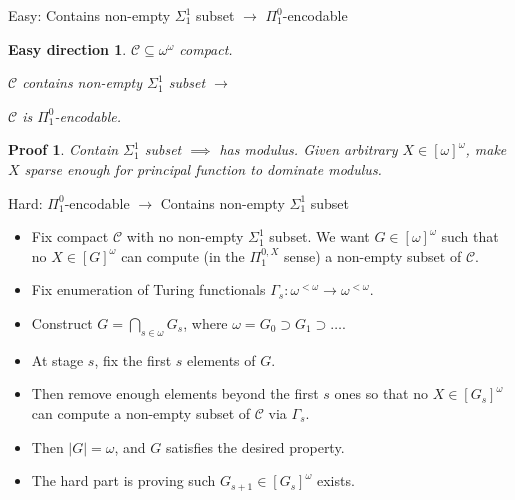 \begin{frame}{Easy: Contains non-empty $\Sigma_1^1$ subset $\rightarrow$
$\Pi_1^0$-encodable}
  \newtheorem{main-easy}{Easy direction}
  \begin{main-easy}
    $\mathcal{C}\subseteq \omega^{\omega}$ compact.

    $\mathcal{C}$ contains non-empty $\Sigma_1^1$ subset
    $\rightarrow$

    $\mathcal{C}$ is $\Pi_1^0$-encodable.
  \end{main-easy}

  \newtheorem{pf-easy}{Proof}
  \begin{pf-easy}
    Contain $\Sigma_1^1$ subset $\implies$ has modulus. Given arbitrary
    $X\in[\omega]^\omega$, make $X$ sparse enough for principal function to
    dominate modulus.
  \end{pf-easy}
\end{frame}

\begin{frame}{Hard: $\Pi_1^0$-encodable $\rightarrow$ Contains
non-empty $\Sigma_1^1$ subset}
  \begin{itemize}
    \item Fix compact $\mathcal{C}$ with no non-empty $\Sigma_1^1$ subset.
      We want $G\in[\omega]^\omega$ such that no $X\in[G]^\omega$
      can compute (in the $\Pi_1^{0,X}$ sense) a non-empty subset of
      $\mathcal{C}$.

    \item Fix enumeration of Turing functionals $\Gamma_s:\omega^{<\omega}
      \rightarrow \omega^{<\omega}$.

    \item Construct $G=\bigcap_{s\in\omega}G_s$, where
      $\omega=G_0\supset G_1\supset\ldots$.
      
    \item At stage $s$, fix the first $s$ elements of $G$.
    
    \item Then remove enough elements beyond the first $s$ ones so that no
      $X\in[G_s]^\omega$ can compute a non-empty subset of $\mathcal{C}$
      via $\Gamma_s$.

    \item Then $|G|=\omega$, and $G$ satisfies the desired property.

    \item The hard part is proving such $G_{s+1}\in[G_s]^\omega$ exists.
  \end{itemize}
\end{frame}

